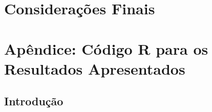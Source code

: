 \documentclass[12pt,reqno,a4paper,oneside]{article}
\begin{document}
\section{Considerações Finais}\label{consfin}





\newpage

\section*{Apêndice: Código R para os Resultados Apresentados}

\subsection*{Introdução}
\end{document}

